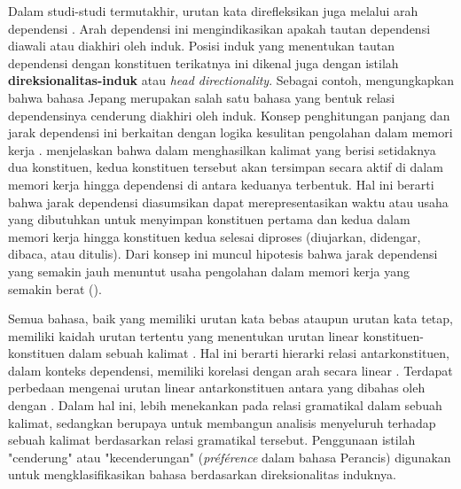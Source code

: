 Dalam studi-studi termutakhir, urutan kata direfleksikan juga melalui arah dependensi \citep{hudson2007language}. Arah dependensi ini mengindikasikan apakah tautan dependensi diawali atau diakhiri oleh induk. Posisi induk yang menentukan tautan dependensi dengan konstituen terikatnya ini dikenal juga dengan istilah \textbf{\gls{direksionalitas-induk}} atau \textit{head directionality}. Sebagai contoh, \cite{hudson2003psychological} mengungkapkan bahwa bahasa Jepang merupakan salah satu bahasa yang bentuk relasi dependensinya cenderung diakhiri oleh induk. Konsep penghitungan panjang dan jarak dependensi ini berkaitan dengan logika kesulitan pengolahan dalam memori kerja \citep{hudson2007language}. \cite{hudson2007language} menjelaskan bahwa dalam menghasilkan kalimat yang berisi setidaknya dua konstituen, kedua konstituen tersebut akan tersimpan secara aktif di dalam memori kerja hingga dependensi di antara keduanya terbentuk. Hal ini berarti bahwa jarak dependensi diasumsikan dapat merepresentasikan waktu atau usaha yang dibutuhkan untuk menyimpan konstituen pertama dan kedua dalam memori kerja hingga konstituen kedua selesai diproses (diujarkan, didengar, dibaca, atau ditulis). Dari konsep ini muncul hipotesis bahwa jarak dependensi yang semakin jauh menuntut usaha pengolahan dalam memori kerja yang semakin berat (\citealp{hudson2007language, gibson1998linguistic}).

Semua bahasa, baik yang memiliki urutan kata bebas ataupun urutan kata tetap, memiliki kaidah urutan tertentu yang menentukan urutan linear konstituen-konstituen dalam sebuah kalimat \citep{tesniere1959elements}. Hal ini berarti hierarki relasi antarkonstituen, dalam konteks dependensi, memiliki korelasi dengan arah secara linear \citep{greenberg1963some}. Terdapat perbedaan mengenai urutan linear antarkonstituen antara yang dibahas oleh \cite{tesniere1959elements} dengan \cite{greenberg1963some}. Dalam hal ini, \cite{greenberg1963some} lebih menekankan pada relasi gramatikal dalam sebuah kalimat, sedangkan \cite{tesniere1959elements} berupaya untuk membangun analisis menyeluruh terhadap sebuah kalimat berdasarkan relasi gramatikal tersebut. Penggunaan istilah "cenderung" atau "kecenderungan" (\textit{pr{\'e}f{\'e}rence} dalam bahasa Perancis) digunakan \cite{tesniere1959elements} untuk mengklasifikasikan bahasa berdasarkan direksionalitas induknya.

